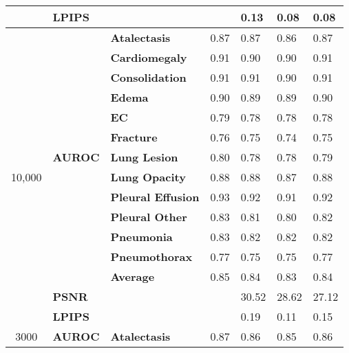 \begin{table}[]
\begin{tabular}{cll|llll}
                                 & \multicolumn{2}{l|}{\textbf{LPIPS}}           & \cellcolor[HTML]{C0C0C0} & 0.13 & 0.08 & 0.08 \\ \hline
\multirow{15}{*}{10,000}               & \multirow{13}{*}{\textbf{AUROC}} & \textbf{Atalectasis}  & 0.87 & 0.87 & 0.86 & 0.87 \\
                                 &                        & \textbf{Cardiomegaly} & 0.91 & 0.90 & 0.90 & 0.91 \\
                                 &                        & \textbf{Consolidation} & 0.91 & 0.91 & 0.90 & 0.91 \\ 
                                 &                        & \textbf{Edema} & 0.90 & 0.89 & 0.89 & 0.90 \\ 
                                 &                        & \textbf{EC} & 0.79 & 0.78 & 0.78 & 0.78 \\ 
                                 &                        & \textbf{Fracture} & 0.76 & 0.75 & 0.74 & 0.75 \\ 
                                 &                        & \textbf{Lung Lesion} & 0.80 & 0.78 & 0.78 & 0.79 \\ 
                                 &                        & \textbf{Lung Opacity} & 0.88 & 0.88 & 0.87 & 0.88 \\ 
                                 &                        & \textbf{Pleural Effusion} & 0.93 & 0.92 & 0.91 & 0.92 \\ 
                                 &                        & \textbf{Pleural Other} & 0.83 & 0.81 & 0.80 & 0.82 \\ 
                                 &                        & \textbf{Pneumonia} & 0.83 & 0.82 & 0.82 & 0.82 \\ 
                                 &                        & \textbf{Pneumothorax} & 0.77 & 0.75 & 0.75 & 0.77 \\
                                 &                        & \textbf{Average} & 0.85 & 0.84 & 0.83 & 0.84 \\ \cline{2-3}
                                 & \multicolumn{2}{l|}{\textbf{PSNR}}            & \cellcolor[HTML]{C0C0C0} & 30.52 & 28.62 & 27.12 \\
                                 & \multicolumn{2}{l|}{\textbf{LPIPS}}           & \cellcolor[HTML]{C0C0C0} & 0.19 & 0.11 & 0.15 \\ \hline
\multirow{15}{*}{3000}               & \multirow{13}{*}{\textbf{AUROC}} & \textbf{Atalectasis}  & 0.87 & 0.86 & 0.85 & 0.86 \\

\end{tabular}
\end{table}
